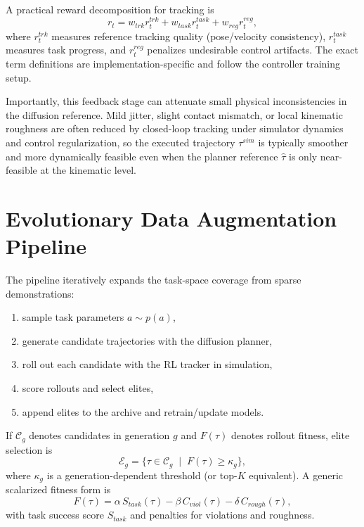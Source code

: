 A practical reward decomposition for tracking is
\begin{equation}
r_t = w_{trk} r_t^{trk} + w_{task} r_t^{task} + w_{reg} r_t^{reg},
\label{eq:tracker_reward_decomp}
\end{equation}
where $r_t^{trk}$ measures reference tracking quality (pose/velocity consistency), $r_t^{task}$ measures task progress, and $r_t^{reg}$ penalizes undesirable control artifacts. The exact term definitions are implementation-specific and follow the controller training setup.

Importantly, this feedback stage can attenuate small physical inconsistencies in the diffusion reference. Mild jitter, slight contact mismatch, or local kinematic roughness are often reduced by closed-loop tracking under simulator dynamics and control regularization, so the executed trajectory $\tau^{sim}$ is typically smoother and more dynamically feasible even when the planner reference $\hat\tau$ is only near-feasible at the kinematic level.

\section{Evolutionary Data Augmentation Pipeline}
\label{sec:evolutionary_pipeline}

The pipeline iteratively expands the task-space coverage from sparse demonstrations:
\begin{enumerate}
    \item sample task parameters $a \sim p(a)$,
    \item generate candidate trajectories with the diffusion planner,
    \item roll out each candidate with the RL tracker in simulation,
    \item score rollouts and select elites,
    \item append elites to the archive and retrain/update models.
\end{enumerate}

If $\mathcal{C}_g$ denotes candidates in generation $g$ and $F(\tau)$ denotes rollout fitness, elite selection is
\begin{equation}
\mathcal{E}_g = \{\tau \in \mathcal{C}_g \;\mid\; F(\tau) \ge \kappa_g\},
\label{eq:elite_selection}
\end{equation}
where $\kappa_g$ is a generation-dependent threshold (or top-$K$ equivalent). A generic scalarized fitness form is
\begin{equation}
F(\tau)=\alpha\,S_{task}(\tau)-\beta\,C_{viol}(\tau)-\delta\,C_{rough}(\tau),
\label{eq:fitness_scalar}
\end{equation}
with task success score $S_{task}$ and penalties for violations and roughness.

